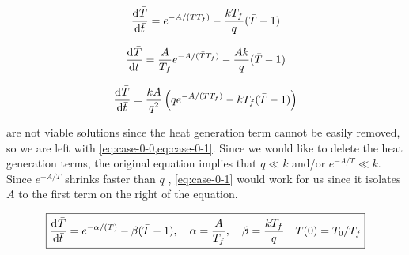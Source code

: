 \documentclass[12pt]{article}
\begin{document}
\begin{enumerate}
  \begin{equation}
    \label{eq:case-0-1}
    \frac{\mathrm{d}^{} {\bar{T}}}{\mathrm{d}{\bar{t}}^{}} =
    e^{-A/(\bar{T}T_f)}-\frac{kT_f}{q}(\bar{T}-1)
  \end{equation}

  \begin{equation}
    \label{eq:case-1-0}
    \frac{\mathrm{d}^{} {\bar{T}}}{\mathrm{d}{\bar{t}}^{}} =
    \frac{A}{T_f}e^{-A/(\bar{T}T_f)}-\frac{Ak}{q}(\bar{T}-1)
  \end{equation}

  \begin{equation}
    \label{eq:case-1-1}
    \frac{\mathrm{d}^{} {\bar{T}}}{\mathrm{d}{\bar{t}}^{}} =
    \frac{kA}{q^2}\left(qe^{-A/(\bar{T}T_f)}-kT_f(\bar{T}-1) \right)
  \end{equation}

   are not viable solutions since the heat
  generation term cannot be easily removed, so we are left with
  \cref{eq:case-0-0,eq:case-0-1}. Since we would like to delete the heat
  generation terms, the original equation implies that $q \ll k$ and/or
  $e^{-A/T} \ll k$. Since $e^{-A/T}$ shrinks faster than $q$ ,
  \cref{eq:case-0-1} would work for us since it isolates $A$ to the first term
  on the right of the equation.

  \begin{equation*} \boxed{
      \frac{\mathrm{d}^{} {\bar{T}}}{\mathrm{d}{\bar{t}}^{}} =
      e^{-\alpha/(\bar{T})}-\beta(\bar{T}-1), \quad \alpha = \frac{A}{T_f},
      \quad \beta = \frac{kT_f}{q} \quad T(0) = T_0/T_f
    }
  \end{equation*}
\end{enumerate}


\newpage
\end{document}
